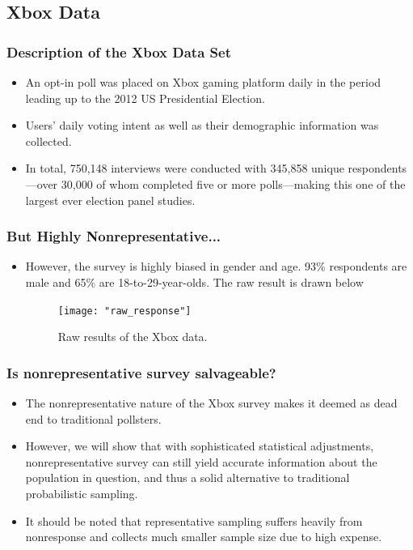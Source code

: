 \documentclass[xetex,mathserif,serif]{beamer}
\begin{document}
\subsection{Xbox Data}
\begin{frame}
  \frametitle{Description of the Xbox Data Set}
  \begin{itemize}
  \item An opt-in poll was placed on Xbox gaming platform daily in the period
    leading up to the 2012 US Presidential Election. 
  \item Users' daily voting intent as well as their demographic information was
    collected.
  \item In total, 750,148 interviews were conducted with 345,858 unique
    respondents—over 30,000 of whom completed five or more polls—making this one
    of the largest ever election panel studies.
  \end{itemize}
\end{frame}

\begin{frame}
  \frametitle{But Highly Nonrepresentative...}
  \begin{itemize}
  \item However, the survey is highly biased in gender and age. 93\% respondents
    are male and 65\% are 18-to-29-year-olds. The raw result is drawn below
    \begin{figure}[htbp]
      \centering
      \texttt{[image: "raw\_response"]}
      \caption{Raw results of the Xbox data.}
      \label{fig:raw}
    \end{figure}
  \end{itemize}
\end{frame}

\begin{frame}
  \frametitle{Is nonrepresentative survey salvageable?}
  \begin{itemize}
  \item The nonrepresentative nature of the Xbox survey makes it deemed as
    dead end to traditional pollsters.  \pause
  \item However, we will show that with sophisticated statistical adjustments,
    nonrepresentative survey can still yield accurate information about the
    population in question, and thus a solid alternative to traditional
    probabilistic sampling.
    \pause
  \item It should be noted that representative sampling suffers heavily from
    nonresponse and collects much smaller sample size due to high expense.
  \end{itemize}
\end{frame}
\end{document}
